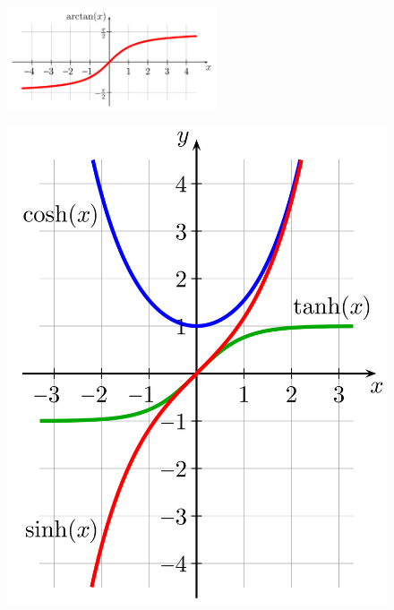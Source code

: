 \begin{figure}[H] 
	\centering
	{\includegraphics[width=0.55\textwidth]{images/arctan.png}}
\end{figure}



\begin{figure}[!htb]
	\centering
	\begin{minipage}{.5\textwidth}
		\centering
		\includegraphics[width=1\linewidth]{images/sinhcoshtanh.png}
	\end{minipage}%
	\begin{minipage}{.5\textwidth}
		\centering

\end{minipage}
\end{figure}
